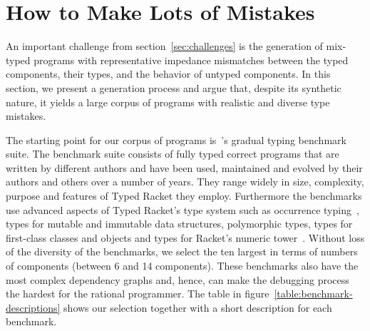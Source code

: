 \section{How to Make Lots of Mistakes} \label{sec:mutate}

An important challenge from section~\ref{sec:challenges} is the generation of
mix-typed programs with representative impedance mismatches between
the typed components, their types, and the behavior of untyped components. In this section, we
present a generation process and argue that, despite its synthetic
nature, it yields a large corpus of programs with  realistic and diverse type mistakes.

The starting point for our corpus of programs
is~\citet{gtnffvf-jfp-2019}'s gradual typing benchmark suite. The
benchmark suite consists of fully typed correct programs that are written by different authors
and have been used, maintained and evolved by their authors and others over a
number of years.  They range widely in size, complexity, purpose and
features of Typed Racket they employ.  Furthermore the benchmarks use advanced aspects
of Typed Racket's type system such as occurrence
typing~\cite{tf-icfp-2010}, types for mutable and immutable data
structures, polymorphic types, types for first-class classes and objects and types for
Racket's numeric tower~\cite{stathff-padl-12}. Without loss of the diversity of the benchmarks,
we select the ten largest in terms of numbers of components (between 6 and 14 components).
These benchmarks also have the most complex dependency graphs and, hence,
can make the debugging process the hardest for the rational programmer.
The table in figure~\ref{table:benchmark-descriptions} shows our selection
together with a short description for each benchmark.


